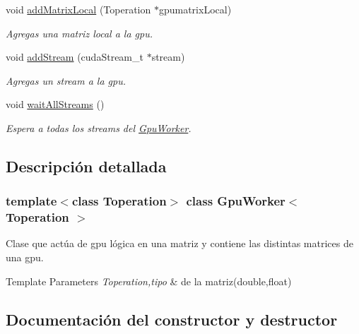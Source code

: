 \begin{DoxyCompactItemize}
void \hyperlink{classGpuWorker_a3e31600ec2e923aaae57f291ee3f42a2}{add\+Matrix\+Local} (Toperation $\ast$gpumatrix\+Local)
\begin{DoxyCompactList}\small\item\em Agregas una matriz local a la gpu. \end{DoxyCompactList}\item 
void \hyperlink{classGpuWorker_a872fa500edc16caf33a73cca29c34526}{add\+Stream} (cuda\+Stream\+\_\+t $\ast$stream)
\begin{DoxyCompactList}\small\item\em Agregas un stream a la gpu. \end{DoxyCompactList}\item 
\mbox{\label{classGpuWorker_a90509efd4abd77b127d6527b3129c4e1}} 
void \hyperlink{classGpuWorker_a90509efd4abd77b127d6527b3129c4e1}{wait\+All\+Streams} ()
\begin{DoxyCompactList}\small\item\em Espera a todas los streams del \hyperlink{classGpuWorker}{Gpu\+Worker}. \end{DoxyCompactList}\end{DoxyCompactItemize}


\subsection{Descripción detallada}
\subsubsection*{template$<$class Toperation$>$\newline
class Gpu\+Worker$<$ Toperation $>$}

Clase que actúa de gpu lógica en una matriz y contiene las distintas matrices de una gpu. 


\begin{DoxyTemplParams}{Template Parameters}
{\em Toperation,tipo} & de la matriz(double,float) \\
\hline
\end{DoxyTemplParams}


\subsection{Documentación del constructor y destructor}
\mbox{\label{classGpuWorker_a8b9430babb610072c3437cf0fe323e83}} 
